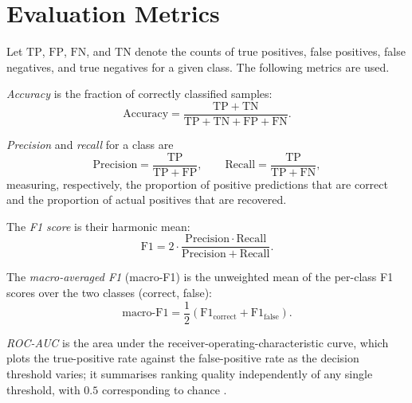 \section{Evaluation Metrics}
\label{sec:setup-metrics}

Let $\mathrm{TP}$, $\mathrm{FP}$, $\mathrm{FN}$, and $\mathrm{TN}$ denote the
counts of true positives, false positives, false negatives, and true negatives
for a given class. The following metrics are used.

\emph{Accuracy} is the fraction of correctly classified samples:
\begin{equation}
\mathrm{Accuracy} =
\frac{\mathrm{TP} + \mathrm{TN}}{\mathrm{TP} + \mathrm{TN} + \mathrm{FP} + \mathrm{FN}}.
\end{equation}

\emph{Precision} and \emph{recall} for a class are
\begin{equation}
\mathrm{Precision} = \frac{\mathrm{TP}}{\mathrm{TP} + \mathrm{FP}},
\qquad
\mathrm{Recall} = \frac{\mathrm{TP}}{\mathrm{TP} + \mathrm{FN}},
\end{equation}
measuring, respectively, the proportion of positive predictions that are correct
and the proportion of actual positives that are recovered.

The \emph{F1 score} is their harmonic mean:
\begin{equation}
\mathrm{F1} =
2 \cdot \frac{\mathrm{Precision} \cdot \mathrm{Recall}}
{\mathrm{Precision} + \mathrm{Recall}}.
\end{equation}

The \emph{macro-averaged F1} (macro-F1) is the unweighted mean of the per-class
F1 scores over the two classes (correct, false):
\begin{equation}
\mathrm{macro\text{-}F1} =
\frac{1}{2}\left(\mathrm{F1}_{\text{correct}} + \mathrm{F1}_{\text{false}}\right).
\end{equation}

\emph{ROC-AUC} is the area under the receiver-operating-characteristic curve,
which plots the true-positive rate against the false-positive rate as the
decision threshold varies; it summarises ranking quality independently of any
single threshold, with $0.5$ corresponding to chance \cite{fawcett2006roc}.

